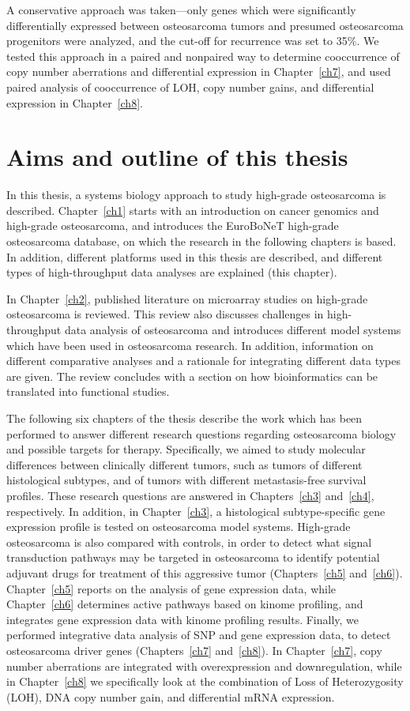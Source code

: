 A conservative approach was taken---only genes which were significantly differentially expressed between osteosarcoma tumors and presumed osteosarcoma progenitors were analyzed, and the cut-off for recurrence was set to 35\%. We tested this approach in a paired and nonpaired way to determine cooccurrence of copy number aberrations and differential expression in Chapter~\ref{ch7}, and used paired analysis of cooccurrence of LOH, copy number gains, and differential expression in Chapter~\ref{ch8}.

%
\section{Aims and outline of this thesis}\label{aims1}
In this thesis, a systems biology approach to study high\hyp{}grade osteosarcoma is described. Chapter~\ref{ch1} starts with an introduction on cancer genomics and high\hyp{}grade osteosarcoma, and introduces the EuroBoNeT high\hyp{}grade osteosarcoma database, on which the research in the following chapters is based. In addition, different platforms used in this thesis are described, and different types of high\hyp{}throughput data analyses are explained (this chapter).

In Chapter~\ref{ch2}, published literature on microarray studies on high\hyp{}grade osteosarcoma is reviewed. This review also discusses challenges in high\hyp{}throughput data analysis of osteosarcoma and introduces different model systems which have been used in osteosarcoma research. In addition, information on different comparative analyses and a rationale for integrating different data types are given. The review concludes with a section on how bioinformatics can be translated into functional studies.

The following six chapters of the thesis describe the work which has been performed to answer different research questions regarding osteosarcoma biology and possible targets for therapy. Specifically, we aimed to study molecular differences between clinically different tumors, such as tumors of different histological subtypes, and of tumors with different metastasis\hyp{}free survival profiles. These research questions are answered in Chapters~\ref{ch3} and~\ref{ch4}, respectively. In addition, in Chapter~\ref{ch3}, a histological subtype\hyp{}specific gene expression profile is tested on osteosarcoma model systems. High\hyp{}grade osteosarcoma is also compared with controls, in order to detect what signal transduction pathways may be targeted in osteosarcoma to identify potential adjuvant drugs for treatment of this aggressive tumor (Chapters~\ref{ch5} and~\ref{ch6}). Chapter~\ref{ch5} reports on the analysis of gene expression data, while Chapter~\ref{ch6} determines active pathways based on kinome profiling, and integrates gene expression data with kinome profiling results. Finally, we performed integrative data analysis of SNP and gene expression data, to detect osteosarcoma driver genes (Chapters~\ref{ch7} and~\ref{ch8}). In Chapter~\ref{ch7}, copy number aberrations are integrated with overexpression and downregulation, while in Chapter~\ref{ch8} we specifically look at the combination of Loss of Heterozygosity (LOH), DNA copy number gain, and differential mRNA expression.

